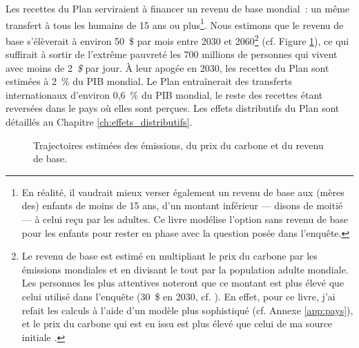 \documentclass[a5paper,french,openany]{memoir}
\begin{document}
Les recettes du Plan serviraient à financer un revenu de base mondial~: un même transfert à tous les humains de 15 ans ou plus\footnote{En réalité, il vaudrait mieux verser également un revenu de base aux (mères des) enfants de moins de 15 ans, d'un montant inférieur --- disons de moitié --- à celui reçu par les adultes. Ce livre modélise l'option sans revenu de base pour les enfants pour rester en phase avec la question posée dans l'enquête.%
}. 
Nous estimons que le revenu de base s'élèverait à environ 50~\$ par mois entre 2030 et 2060\footnote{Le revenu de base est estimé en multipliant le prix du carbone par les émissions mondiales et en divisant le tout par la population adulte mondiale. Les personnes les plus attentives noteront que ce montant est plus élevé que celui utilisé dans l'enquête (30~\$ en 2030, cf. \citealp{fabre_global_2023}). En effet, pour ce livre, j'ai refait les calculs à l'aide d'un modèle plus sophistiqué (cf. Annexe \ref{app:pays}), et le prix du carbone qui est en issu est plus élevé que celui de ma source initiale \citep{stern_report_2017}.} (cf. Figure \ref{fig:trajectory}), 
ce qui suffirait à sortir de l'extrême pauvreté les 700 millions de personnes qui vivent avec moins de 2~\textit{\$} par jour. À leur apogée en 2030, les recettes du Plan sont estimées à 2~\% du PIB mondial. Le Plan entraînerait des transferts internationaux d'environ 0,6~\% %
du PIB mondial, le reste %
des recettes étant reversées dans le pays où elles sont perçues. Les effets distributifs du Plan sont détaillés au Chapitre \ref{ch:effets_distributifs}. %

\begin{figure}[h!]
  \caption[Trajectoires (émissions, prix, revenu de base)]{Trajectoires estimées des émissions, du prix du carbone et du revenu de base.}\label{fig:trajectory}
\end{figure} 
\end{document}
